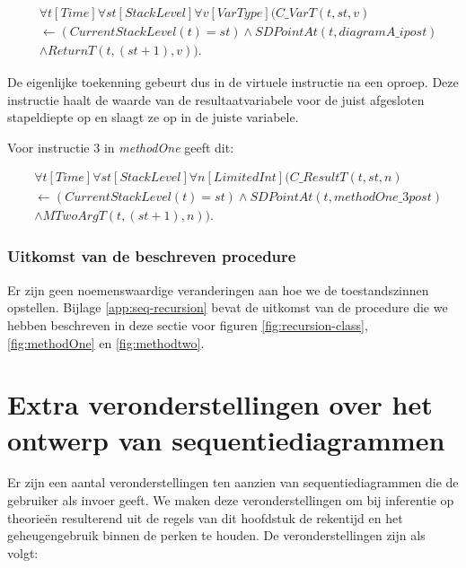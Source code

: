 \begin{align*}
	&\forall{t}[Time]\forall{st}[StackLevel]\forall{v}[VarType](C\_VarT(t, st, v) \\ &\leftarrow (CurrentStackLevel(t) = st) \land SDPointAt(t, diagramA\_ipost) \\ &\land ReturnT(t, (st+1), v)).
\end{align*}

De eigenlijke toekenning gebeurt dus in de virtuele instructie na een oproep. Deze instructie haalt de waarde van de resultaatvariabele voor de juist afgesloten stapeldiepte op en slaagt ze op in de juiste variabele.

Voor instructie 3 in \textit{methodOne} geeft dit:

\begin{align*}
&\forall{t}[Time]\forall{st}[StackLevel]\forall{n}[LimitedInt](C\_ResultT(t, st, n) \\ &\leftarrow (CurrentStackLevel(t) = st) \land SDPointAt(t, methodOne\_3post) \\ &\land MTwoArgT(t, (st+1), n)).
\end{align*}

\subsubsection{Uitkomst van de beschreven procedure}
Er zijn geen noemenswaardige veranderingen aan hoe we de toestandszinnen opstellen. Bijlage \ref{app:seq-recursion} bevat de uitkomst van de procedure die we hebben beschreven in deze sectie voor figuren \ref{fig:recursion-class}, \ref{fig:methodOne} en \ref{fig:methodtwo}. 

\section{Extra veronderstellingen over het ontwerp van sequentiediagrammen}\label{sec:beperkingen}
Er zijn een aantal veronderstellingen ten aanzien van sequentiediagrammen die de gebruiker als invoer geeft. We maken deze veronderstellingen om bij inferentie op theorie\"en resulterend uit de regels van dit hoofdstuk de rekentijd en het geheugengebruik binnen de perken te houden. De veronderstellingen zijn als volgt:

